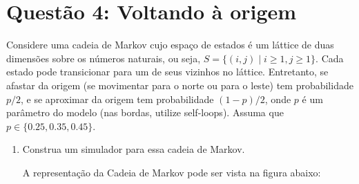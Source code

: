 \section*{Questão 4: Voltando à origem}
Considere uma cadeia de Markov cujo espaço de estados é um láttice de duas dimensões sobre os números naturais, ou seja, $S = \{(i, j) \mid i \geq 1, j \geq 1\}$. Cada estado pode transicionar para um de seus vizinhos no láttice. Entretanto, se afastar da origem (se movimentar para o norte ou para o leste) tem probabilidade $p/2$, e se aproximar da origem tem probabilidade $(1-p)/2$, onde $p$ é um parâmetro do modelo (nas bordas, utilize self-loops). Assuma que $p \in \{0.25, 0.35, 0.45\}$.

\begin{enumerate}
    \item Construa um simulador para essa cadeia de Markov.
    \begin{resposta}
        A representação da Cadeia de Markov pode ser vista na figura abaixo:
        \begin{center}
\end{center}
\end{resposta}
\end{enumerate}
